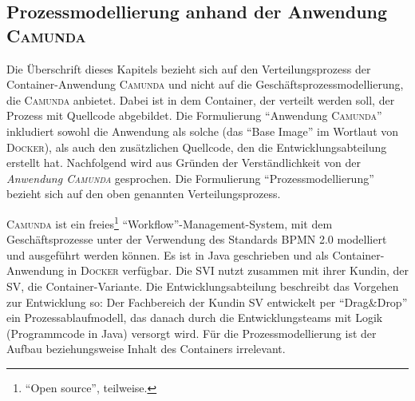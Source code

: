 \subsection{Prozessmodellierung anhand der Anwendung \textsc{Camunda}}
Die Überschrift dieses Kapitels bezieht sich auf den Verteilungsprozess der Container-Anwendung \textsc{Camunda} und nicht auf die Geschäftsprozessmodellierung, die \textsc{Camunda} anbietet. Dabei ist in dem Container, der verteilt werden soll, der Prozess mit Quellcode abgebildet. Die Formulierung \enquote{Anwendung \textsc{Camunda}} inkludiert sowohl die Anwendung als solche (das \enquote{Base Image} im Wortlaut von \textsc{Docker}), als auch den zusätzlichen Quellcode, den die Entwicklungsabteilung erstellt hat. Nachfolgend wird aus Gründen der Verständlichkeit von der \textit{Anwendung \textsc{Camunda}} gesprochen. Die Formulierung \enquote{Prozessmodellierung} bezieht sich auf den oben genannten Verteilungsprozess.
\par
\textsc{Camunda} ist ein freies\footnote{\enquote{Open source}, teilweise.} \enquote{Workflow}-Management-System, mit dem Geschäftsprozesse unter der Verwendung des Standards BPMN 2.0\autocite{object_management_group_omg_business_2011} modelliert und ausgeführt werden können.\autocite[vgl.][]{camunda_services_gmbh_workflow_2020} Es ist in Java geschrieben und als Container-Anwendung in \textsc{Docker} verfügbar. Die \ac{SVI} nutzt zusammen mit ihrer Kundin, der \ac{SV}, die Container-Variante. Die Entwicklungsabteilung beschreibt das Vorgehen zur Entwicklung so: Der Fachbereich der Kundin \ac{SV} entwickelt per \enquote{Drag\&Drop} ein Prozessablaufmodell, das danach durch die Entwicklungsteams mit Logik (Programmcode in Java) versorgt wird. Für die Prozessmodellierung ist der Aufbau beziehungsweise Inhalt des Containers irrelevant. 
\par
